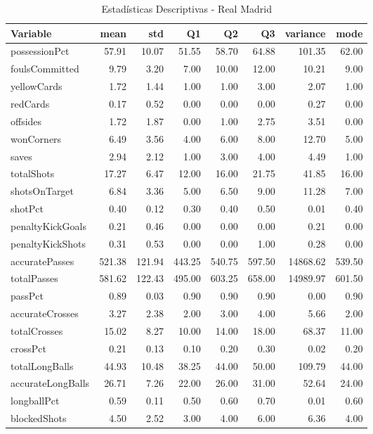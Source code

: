 \begin{table}[H]
\centering
\caption{Estadísticas Descriptivas - Real Madrid}
\label{tab:esp_real_madrid}
\small
\begin{tabular}{lrrrrrrr}
\hline
Variable & mean & std & Q1 & Q2 & Q3 & variance & mode \\
\hline
possessionPct & 57.91 & 10.07 & 51.55 & 58.70 & 64.88 & 101.35 & 62.00 \\
foulsCommitted & 9.79 & 3.20 & 7.00 & 10.00 & 12.00 & 10.21 & 9.00 \\
yellowCards & 1.72 & 1.44 & 1.00 & 1.00 & 3.00 & 2.07 & 1.00 \\
redCards & 0.17 & 0.52 & 0.00 & 0.00 & 0.00 & 0.27 & 0.00 \\
offsides & 1.72 & 1.87 & 0.00 & 1.00 & 2.75 & 3.51 & 0.00 \\
wonCorners & 6.49 & 3.56 & 4.00 & 6.00 & 8.00 & 12.70 & 5.00 \\
saves & 2.94 & 2.12 & 1.00 & 3.00 & 4.00 & 4.49 & 1.00 \\
totalShots & 17.27 & 6.47 & 12.00 & 16.00 & 21.75 & 41.85 & 16.00 \\
shotsOnTarget & 6.84 & 3.36 & 5.00 & 6.50 & 9.00 & 11.28 & 7.00 \\
shotPct & 0.40 & 0.12 & 0.30 & 0.40 & 0.50 & 0.01 & 0.40 \\
penaltyKickGoals & 0.21 & 0.46 & 0.00 & 0.00 & 0.00 & 0.21 & 0.00 \\
penaltyKickShots & 0.31 & 0.53 & 0.00 & 0.00 & 1.00 & 0.28 & 0.00 \\
accuratePasses & 521.38 & 121.94 & 443.25 & 540.75 & 597.50 & 14868.62 & 539.50 \\
totalPasses & 581.62 & 122.43 & 495.00 & 603.25 & 658.00 & 14989.97 & 601.50 \\
passPct & 0.89 & 0.03 & 0.90 & 0.90 & 0.90 & 0.00 & 0.90 \\
accurateCrosses & 3.27 & 2.38 & 2.00 & 3.00 & 4.00 & 5.66 & 2.00 \\
totalCrosses & 15.02 & 8.27 & 10.00 & 14.00 & 18.00 & 68.37 & 11.00 \\
crossPct & 0.21 & 0.13 & 0.10 & 0.20 & 0.30 & 0.02 & 0.20 \\
totalLongBalls & 44.93 & 10.48 & 38.25 & 44.00 & 50.00 & 109.79 & 44.00 \\
accurateLongBalls & 26.71 & 7.26 & 22.00 & 26.00 & 31.00 & 52.64 & 24.00 \\
longballPct & 0.59 & 0.11 & 0.50 & 0.60 & 0.70 & 0.01 & 0.60 \\
blockedShots & 4.50 & 2.52 & 3.00 & 4.00 & 6.00 & 6.36 & 4.00 \\

\end{tabular}
\end{table}
